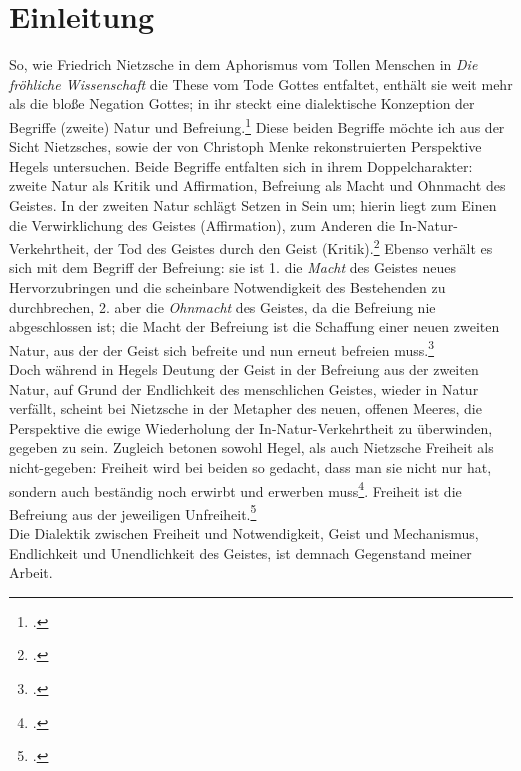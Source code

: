 \documentclass[12pt, a4paper, openany]{report}
\begin{document}
\tableofcontents

\mainmatter

\chapter{Einleitung}
So, wie Friedrich Nietzsche in dem Aphorismus vom \glqq Tollen Menschen\grqq{} in \textit{Die fröhliche Wissenschaft} die These vom Tode Gottes entfaltet, enthält sie weit mehr als die bloße Negation Gottes;
in ihr steckt eine dialektische Konzeption der Begriffe (zweite) Natur und Befreiung.\footcite[Vgl.][481]{nietzsche_morgenrote_1999}
Diese beiden Begriffe möchte ich aus der Sicht Nietzsches, sowie der von Christoph Menke rekonstruierten Perspektive Hegels untersuchen.
Beide Begriffe entfalten sich in ihrem Doppelcharakter: zweite Natur als Kritik und Affirmation, Befreiung als Macht und Ohnmacht des Geistes.
In der zweiten Natur schlägt Setzen in Sein um; hierin liegt zum Einen die Verwirklichung des Geistes (Affirmation), zum Anderen die In-Natur-Verkehrtheit, der Tod des Geistes durch den Geist (Kritik).\footcite[Vgl.][145]{menke_autonomie_2018}
Ebenso verhält es sich mit dem Begriff der Befreiung: 
sie ist 1. die \textit{Macht} des Geistes neues Hervorzubringen und die scheinbare Notwendigkeit des Bestehenden zu durchbrechen, 
2. aber die \textit{Ohnmacht} des Geistes, da die Befreiung nie abgeschlossen ist; die Macht der Befreiung ist die Schaffung einer \glqq neuen\grqq{} zweiten Natur, aus der der Geist sich befreite und nun erneut befreien muss.\footcite[Vgl.][80]{menke_autonomie_2018}\\
Doch während in Hegels Deutung der Geist in der Befreiung aus der zweiten Natur, auf Grund der Endlichkeit des menschlichen Geistes, wieder in Natur verfällt, scheint bei Nietzsche in der Metapher des neuen, offenen Meeres, die Perspektive die ewige Wiederholung der In-Natur-Verkehrtheit zu überwinden, gegeben zu sein.
Zugleich betonen sowohl Hegel, als auch Nietzsche Freiheit als nicht-gegeben: 
Freiheit wird bei beiden so gedacht, dass man sie \glqq nicht nur hat, sondern auch beständig  noch erwirbt und erwerben muss\grqq\footcite[][637]{nietzsche_morgenrote_1999}. 
Freiheit ist die Befreiung aus der jeweiligen Unfreiheit.\footcite[Vgl][227]{adorno_negative_dialektik_2003} \\ 
Die Dialektik zwischen Freiheit und Notwendigkeit, Geist und Mechanismus, Endlichkeit und Unendlichkeit des Geistes, ist demnach Gegenstand meiner Arbeit. 
\end{document}
